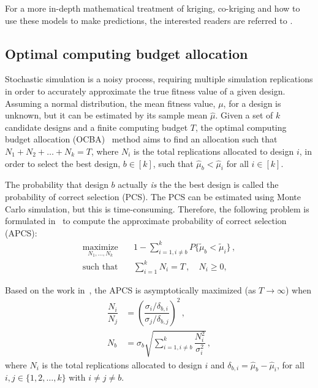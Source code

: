 For a more in-depth mathematical treatment of kriging, co-kriging and how to use these models to make predictions, the interested readers are referred to \cite{forrester2008engineering,forrester2007multi,kennedy2001bayesian,kennedy2000predicting}.

\subsection{Optimal computing budget allocation}
Stochastic simulation is a noisy process, requiring multiple simulation replications in order to accurately approximate the true fitness value of a given design. Assuming a normal distribution, the mean fitness value, $\mu$, for a design is unknown, but it can be estimated by its sample mean $\hat{\mu}$. 
Given a set of $k$ candidate designs and a finite computing budget $T$, the optimal computing budget allocation (OCBA)~\cite{chen2011stochastic} method aims to find an allocation such that ${N_1 + N_2 + \ldots + N_k = T}$, where $N_i$ is the total replications allocated to design $i$, in order to select the best design, $b \in [k]$, such that $\hat{\mu}_b < \hat{\mu}_i$ for all $i \in [k]$.

The probability that design $b$ actually \emph{is} the the best design is called the probability of correct selection (PCS). The PCS can be estimated using Monte Carlo simulation, but this is time-consuming. Therefore, the following problem is formulated in~\cite{chen2011stochastic} to compute the approximate probability of correct selection (APCS):
\begin{align}
\underset{N_1,\dots,N_k}{\text{maximize}}&\quad 1 - \displaystyle\sum^k_{i=1,i\neq b}P\{\tilde\mu_b < \tilde\mu_i\}\,,\nonumber\\
\text{such that}& \quad \displaystyle\sum^k_{i=1}N_i = T\,, \quad N_i \geq 0,
\end{align}

Based on the work in~\cite{chen2011stochastic}, the APCS is asymptotically maximized (as $T \to \infty$) when
\begin{align}
\dfrac{N_i}{N_j} &= \left(\dfrac{\sigma_i/\delta_{b,i}}{\sigma_j/\delta_{b,j}}\right)^2\,,\label{eq:apcs1}\\[0.2cm]
N_b &= \sigma_b \sqrt{\displaystyle\sum^k_{i=1,i\neq b}\dfrac{N_i^2}{\sigma_i^2}}\,,\label{eq:apcs2}
\end{align}
where $N_i$ is the total replications allocated to design $i$ and $\delta_{b,i} = \hat{\mu}_b - \hat{\mu}_i$, for all $i,j\in \{1,2,\dots,k\}$ with $i \neq j \neq b$.{}

